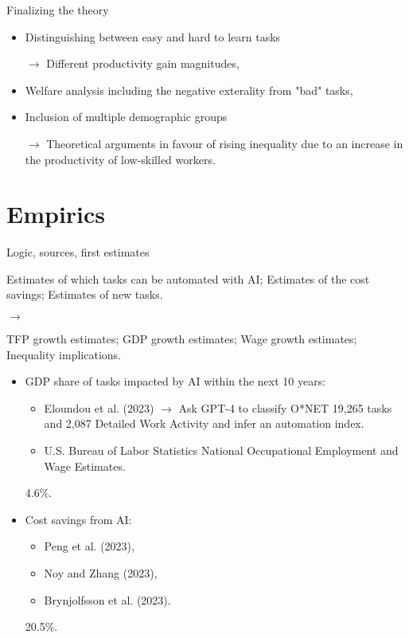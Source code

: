 \documentclass{beamer}
\begin{document}
\begin{frame}{Finalizing the theory}

\begin{itemize}
    \item Distinguishing between easy and hard to learn tasks
    
    \(\rightarrow\) Different productivity gain magnitudes,
    \item Welfare analysis including the negative exterality from "bad" tasks,
    \item Inclusion of multiple demographic groups
    
    \(\rightarrow\) Theoretical arguments in favour of rising inequality due to an increase in the productivity of low-skilled workers.
\end{itemize}

\end{frame}

\section{Empirics}
    
\begin{frame}{Logic, sources, first estimates}

    Estimates of which tasks can be automated with AI;
    Estimates of the cost savings;
    Estimates of new tasks.
    
    \(\rightarrow\)
    
    TFP growth estimates; GDP growth estimates; Wage growth estimates; Inequality implications.
    \newline
    \begin{itemize}
        \item GDP share of tasks impacted by AI within the next 10 years:
        \begin{itemize}
            \item Eloundou et al. (2023) \(\rightarrow\) Ask GPT-4 to classify O*NET 19,265 tasks and 2,087 Detailed Work Activity and infer an automation index.
            \item U.S. Bureau of Labor Statistics National Occupational Employment and Wage Estimates.
        \end{itemize}
        4.6\%.
        \item Cost savings from AI:
        \begin{itemize}
            \item Peng et al. (2023),
            \item Noy and Zhang (2023),
            \item Brynjolfsson et al. (2023).
        \end{itemize}
        20.5\%.

    \end{itemize}

\end{frame}
\end{document}
